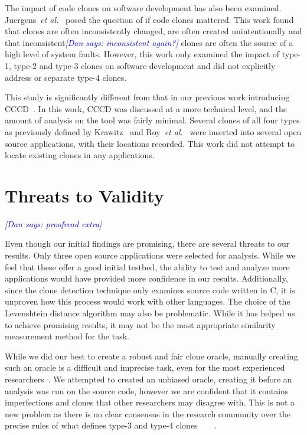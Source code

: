 \documentclass{sig-alternate}
\newcommand{\dan}[1]{\textcolor{blue}{{\it [Dan says: #1]}}}
\begin{document}
The impact of code clones on software development has also been examined. Juergens~\emph{et al.}~\cite{Juergens:2009:CCM:1555001.1555062} posed the question of if code clones mattered. This work found that clones are often inconsistently changed, are often created unintentionally and that inconsistent\dan{inconsistent again?} clones are often the source of a high level of system faults. However, this work only examined the impact of type-1, type-2 and type-3 clones on software development and did not explicitly address or separate type-4 clones.

This study is significantly different from that in our previous work introducing CCCD~\cite{wcre2013}. In this work, CCCD was discussed at a more technical level, and the amount of analysis on the tool was fairly minimal. Several clones of all four types as previously defined by Krawitz~\cite{Kraw2012} and Roy~\emph{et al.}~\cite{Roy:2009:CEC:1530898.1531101} were inserted into several open source applications, with their locations recorded. This work did not attempt to locate existing clones in any applications.



\section{Threats to Validity}
\label{sec: threats}
\dan{proofread extra}

Even though our initial findings are promising, there are several threats to our results. Only three open source applications were selected for analysis. While we feel that these offer a good initial testbed, the ability to test and analyze more applications would have provided more confidence in our results. Additionally, since the clone detection technique only examines source code written in C, it is unproven how this process would work with other languages. The choice of the Levenshtein distance algorithm may also be problematic. While it has helped us to achieve promising results, it may not be the most appropriate similarity measurement method for the task. 


While we did our best to create a robust and fair clone oracle, manually creating such an oracle is a difficult and imprecise task, even for the most experienced researchers~\cite{Walenstein:2003:PCT:950792.951349}. We attempted to created an unbiased oracle, creating it before an analysis was run on the source code, however we are confident that it contains imperfections and clones that other researchers may disagree with. This is not a new problem as there is no clear consensus in the research community over the precise rules of what defines type-3 and type-4 clones~\cite{Roy:2009:CEC:1530898.1531101}~\cite{Gabel:2008:SDS:1368088.1368132}~\cite{Liu06gplag:detection}~\cite{Kim:2011:MMC:1985793.1985835}.
\end{document}
